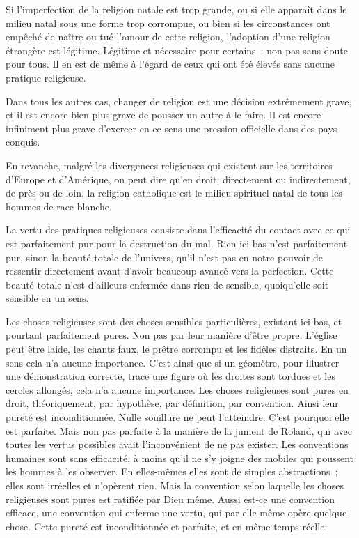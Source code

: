 \documentclass[french,twoside]{book} %
\begin{document}
Si l'imperfection de la religion natale est trop grande, ou si elle apparaît dans le milieu natal sous une forme trop corrompue, ou bien si les circonstances ont empêché de naître ou tué l'amour de cette religion, l'adoption d'une religion étrangère est légitime. Légitime et nécessaire pour certains ; non pas sans doute pour tous. Il en est de même à l'égard de ceux qui ont été élevés sans aucune pratique religieuse.\par
Dans tous les autres cas, changer de religion est une décision extrêmement grave, et il est encore bien plus grave de pousser un autre à le faire. Il est encore infiniment plus grave d'exercer en ce sens une pression officielle dans des pays conquis.\par
En revanche, malgré les divergences religieuses qui existent sur les territoires d'Europe et d'Amérique, on peut dire qu'en droit, directement ou indirectement, de près ou de loin, la religion catholique est le milieu spirituel natal de tous les hommes de race blanche.\par
La vertu des pratiques religieuses consiste dans l'efficacité du contact avec ce qui est parfaitement pur pour la destruction du mal. Rien ici-bas n'est parfaitement pur, sinon la beauté totale de l'univers, qu'il n'est pas en notre pouvoir de ressentir directement avant d'avoir beaucoup avancé vers la perfection. Cette beauté totale n'est d'ailleurs enfermée dans rien de sensible, quoiqu'elle soit sensible en un sens.\par
Les choses religieuses sont des choses sensibles particulières, existant ici-bas, et pourtant parfaitement pures. Non pas par leur manière d'être propre. L'église peut être laide, les chants faux, le prêtre corrompu et les fidèles distraits. En un sens cela n'a aucune importance. C'est ainsi que si un géomètre, pour illustrer une démonstration correcte, trace une figure où les droites sont tordues et les cercles allongés, cela n'a aucune importance. Les choses religieuses sont pures en droit, théoriquement, par hypothèse, par définition, par convention. Ainsi leur pureté est inconditionnée. Nulle souillure ne peut l'atteindre. C'est pourquoi elle est parfaite. Mais non pas parfaite à la manière de la jument de Roland, qui avec toutes les vertus possibles avait l'inconvénient de ne pas exister. Les conventions humaines sont sans efficacité, à moins qu'il ne s'y joigne des mobiles qui poussent les hommes à les observer. En elles-mêmes elles sont de simples abstractions ; elles sont irréelles et n'opèrent rien. Mais la convention selon laquelle les choses religieuses sont pures est ratifiée par Dieu même. Aussi est-ce une convention efficace, une convention qui enferme une vertu, qui par elle-même opère quelque chose. Cette pureté est inconditionnée et parfaite, et en même temps réelle.\par
\end{document}

